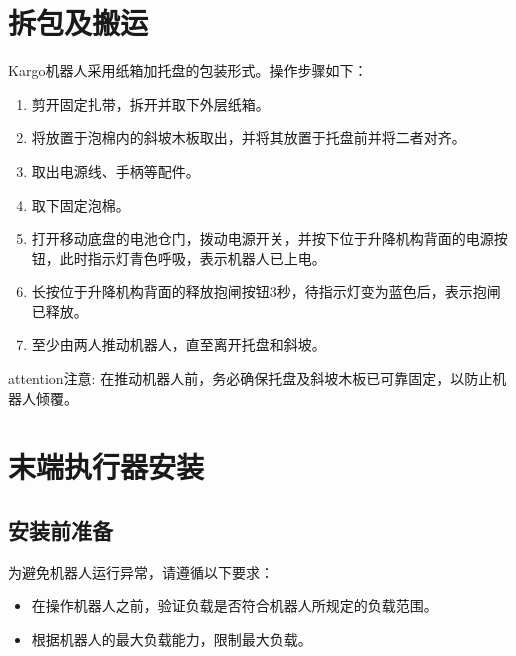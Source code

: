 \documentclass[a4paper,11pt,english,openany,oneside]{sphinxmanual}
\begin{document}
\section{拆包及搬运}
\label{\detokenize{08 _u5b89_u88c5_u4e0e_u8c03_u8bd5:id9}}\label{\detokenize{08 _u5b89_u88c5_u4e0e_u8c03_u8bd5:id10}}
\sphinxAtStartPar
Kargo机器人采用纸箱加托盘的包装形式。操作步骤如下：
\begin{enumerate}
%
\item {} 
\sphinxAtStartPar
剪开固定扎带，拆开并取下外层纸箱。

\item {} 
\sphinxAtStartPar
将放置于泡棉内的斜坡木板取出，并将其放置于托盘前并将二者对齐。

\item {} 
\sphinxAtStartPar
取出电源线、手柄等配件。

\item {} 
\sphinxAtStartPar
取下固定泡棉。

\item {} 
\sphinxAtStartPar
打开移动底盘的电池仓门，拨动电源开关，并按下位于升降机构背面的电源按钮，此时指示灯青色呼吸，表示机器人已上电。

\item {} 
\sphinxAtStartPar
长按位于升降机构背面的释放抱闸按钮3秒，待指示灯变为蓝色后，表示抱闸已释放。

\item {} 
\sphinxAtStartPar
至少由两人推动机器人，直至离开托盘和斜坡。

\end{enumerate}

\begin{sphinxadmonition}{attention}{注意:}
\sphinxAtStartPar
在推动机器人前，务必确保托盘及斜坡木板已可靠固定，以防止机器人倾覆。
\end{sphinxadmonition}


\section{末端执行器安装}
\label{\detokenize{08 _u5b89_u88c5_u4e0e_u8c03_u8bd5:id11}}\label{\detokenize{08 _u5b89_u88c5_u4e0e_u8c03_u8bd5:id12}}

\subsection{安装前准备}
\label{\detokenize{08 _u5b89_u88c5_u4e0e_u8c03_u8bd5:id13}}\label{\detokenize{08 _u5b89_u88c5_u4e0e_u8c03_u8bd5:id14}}
\sphinxAtStartPar
为避免机器人运行异常，请遵循以下要求：
\begin{itemize}
\item {} 
\sphinxAtStartPar
在操作机器人之前，验证负载是否符合机器人所规定的负载范围。

\item {} 
\sphinxAtStartPar
根据机器人的最大负载能力，限制最大负载。

\end{itemize}
\end{document}
